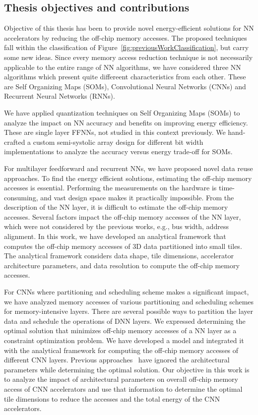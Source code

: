 \subsection{Thesis objectives and contributions}
Objective of this thesis has been to provide novel energy-efficient solutions for NN accelerators by reducing the off-chip memory accesses. The proposed techniques fall within the classification of Figure~\ref{fig:previousWorkClassification}, but carry some new ideas. Since every memory access reduction technique is not necessarily applicable to the entire range of NN algorithms, we have considered three NN algorithms which present quite differeent characteristics from each other. These are Self Organizing Maps (SOMs), Convolutional Neural Networks (CNNs) and Recurrent Neural Networks (RNNs).

We have applied quantization techniques on Self Organizing Maps (SOMs) to analyze the
impact on NN accuracy and benefits on improving energy efficiency. These are single layer
FFNNs, not studied in this context previously. We hand-crafted a custom semi-systolic array design for different bit width implementations to analyze the accuracy versus energy trade-off for SOMs. 

For multilayer feedforward and recurrent NNs, we have proposed novel data reuse approaches. To find the energy efficient solutions, estimating the off-chip memory accesses is essential. Performing the measurements on the hardware is time-consuming, and vast design space makes it practically impossible. From the description of the NN layer, it is difficult to estimate the off-chip memory accesses. Several factors impact the off-chip memory accesses of the NN layer, which were not considered by the previous works, e.g., bus width, address alignment. In this work, we have developed an analytical framework that computes the off-chip memory accesses of 3D data partitioned into small tiles. The analytical framework considers data shape, tile dimensions, accelerator architecture parameters, and data resolution to compute the off-chip memory accesses.

For CNNs where partitioning and scheduling scheme makes a significant impact, we have analyzed memory accesses of various partitioning and scheduling schemes for memory-intensive layers. There are several possible ways to partition the layer data and schedule the operations of DNN layers. We expressed determining the optimal solution that minimizes off-chip memory accesses of a NN layer as a constraint optimization problem. We have developed a model and integrated it with the analytical framework for computing the off-chip memory accesses of different CNN layers. Previous approaches~\cite{zhang2015optimizing, Li2018SmartShuttleOO} have ignored the architectural parameters while determining the optimal solution. Our objective in this work is to analyze the impact of architectural parameters on overall off-chip memory access of CNN accelerators and use that information to determine the optimal tile dimensions to reduce the accesses and the total energy of the CNN accelerators.

